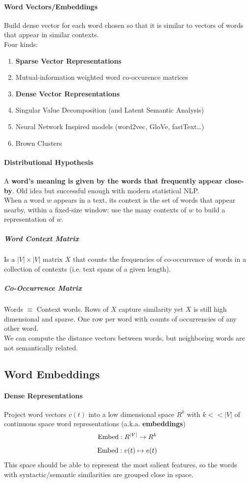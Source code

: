 \documentclass[10pt]{report}
\begin{document}
\paragraph{Word Vectors/Embeddings} Build dense vector for each word chosen so that it is similar to vectors of words that appear in similar contexts.\\
Four kinds:\begin{enumerate}
	\item[] \textbf{Sparse Vector Representations}
	\item Mutual-information weighted word co-occurence matrices
	\item[] \textbf{Dense Vector Representations}
	\item Singular Value Decomposition (and Latent Semantic Analysis)
	\item Neural Network Inspired models (word2vec, GloVe, fastText\ldots)
	\item Brown Clusters
\end{enumerate}
\paragraph{Distributional Hypothesis} A \textbf{word's meaning is given by the words that frequently appear close-by}. Old idea but successful enough with modern statistical NLP.\\
When a word $w$ appears in a text, its context is the set of words that appear nearby, within a fixed-size window: use the many contexts of $w$ to build a representation of $w$.
\subparagraph{Word Context Matrix} Is a $|V|\times|V|$ matrix $X$ that counts the frequencies of co-occurrence of words in a collection of contexts (i.e. text spans of a given length).
\subparagraph{Co-Occurrence Matrix} Words $\equiv$ Context words. Rows of $X$ capture similarity yet $X$ is still high dimensional and sparse. One row per word with counts of occurrencies of any other word.\\
We can compute the distance vectors between words, but neighboring words are not semantically related.
\subsection{Word Embeddings}
\paragraph{Dense Representations} Project word vectors $v(t)$ into a low dimensional space $R^k$ with $k<<|V|$ of continuous space word representations (a.k.a. \textbf{embeddings})
$$\hbox{Embed} : R^{|V|}\rightarrow R^k$$
$$\hbox{Embed} : v(t) \mapsto e(t)$$
This space should be able to represent the most salient features, so the words with syntactic/semantic similarities are grouped close in space.
\end{document}
